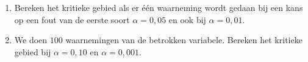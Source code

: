 \begin{enumerate}[label=(\alph*)]
    \item Bereken het kritieke gebied als er \'e\'en waarneming wordt gedaan bij een kans op een fout van de eerste soort $\alpha=0,05$ en ook bij $\alpha=0,01$.
    \answer{
    }

    \item We doen $100$ waarnemingen van de betrokken variabele.
    Bereken het kritieke gebied bij $\alpha=0,10$ en $\alpha=0,001$.
    \answer{
        
    }
\end{enumerate}